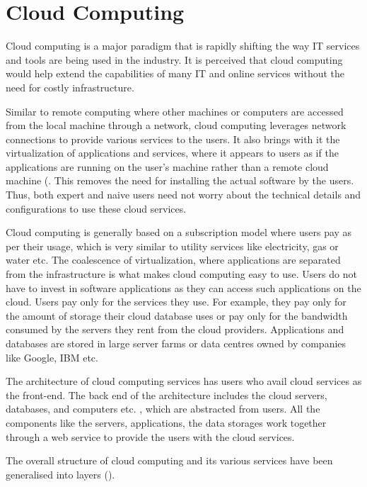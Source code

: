 \section{Cloud Computing} \label{s:cloudComputing}
Cloud computing is a major paradigm that is rapidly shifting the way \ac{IT}
services and tools are being used in the industry.  It is perceived that cloud
computing would help extend the capabilities of many \ac{IT} and online services
without the need for costly infrastructure.

Similar to remote computing where other machines or computers are accessed from
the local machine through a network,   cloud computing leverages network
connections to provide various services to the users.  It also brings with it
the virtualization of applications and services,   where it appears to users as
if the applications are running on the user's machine rather than a remote cloud
machine (.  This removes the need for
installing the actual software by the users.  Thus,   both expert and naive
users need not worry about the technical details and configurations to use these
cloud services.

Cloud computing is generally based on a subscription model where users pay as
per their usage,   which is very similar to utility services like electricity,  
gas or water etc.  The coalescence of virtualization,   where applications are
separated from the infrastructure is what makes cloud computing easy to use.
Users do not have to invest in software applications as they can access such
applications on the cloud.  Users pay only for the services they use.  For
example,   they pay only for the amount of storage their cloud database uses or
pay only for the bandwidth consumed by the servers they rent from the cloud
providers.  Applications and databases are stored in large server farms or data
centres owned by companies like Google,  IBM etc.

The architecture of cloud computing services has users who avail cloud services
as the front-end.  The back end of the architecture includes the cloud servers,
databases,   and computers etc. ,   which are abstracted from users.  All the
components like the servers,   applications,   the data storages work together
through a web service to provide the users with the cloud services. 

The overall structure of cloud computing and its various services have been
generalised into layers (). 

